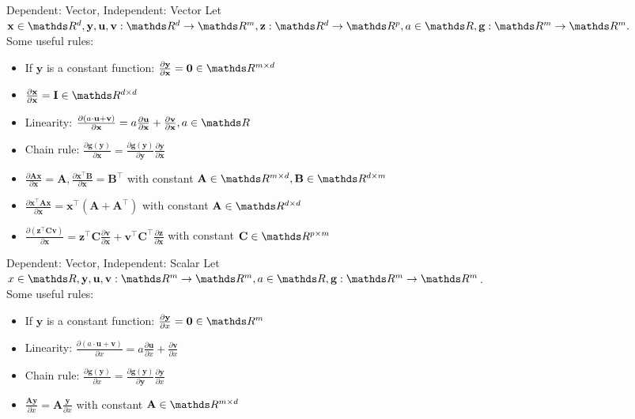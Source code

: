 \documentclass[11pt,compress,t,notes=noshow, xcolor=table]{beamer}
\begin{document}
\begin{vbframe}{Dependent: Vector, Independent: Vector}
Let $\mathbf{x} \in \R^d, \mathbf{y},  \mathbf{u}, \mathbf{v}: \R^d \rightarrow \R^m,\mathbf{z}:\R^d\rightarrow\R^p, a \in \R, \mathbf{g}:\R^m\rightarrow  \R^m.$ \\
\medskip
Some useful rules:
\begin{itemize}
    \item If $\mathbf{y}$ is a constant function: $\frac{\partial \mathbf{y}}{\partial \mathbf{x}} = \mathbf{0} \in \R^{m \times d}$
    \item $\frac{\partial \mathbf{x}}{\partial \mathbf{x}} = \mathbf{I} \in \R^{d \times d}$
    \item Linearity: $\frac{\partial (a\cdot \mathbf{u} + \mathbf{v})}{\partial \mathbf{x}} = a\frac{\partial \mathbf{u}}{\partial \mathbf{x}} + \frac{\partial \mathbf{v}}{\partial \mathbf{x}}, a \in \R $
    \item Chain rule: $\frac{\partial \mathbf{g}(\mathbf{y})}{\partial \mathbf{x}} = \frac{\partial \mathbf{g}(\mathbf{y})}{\partial \mathbf{y}}\frac{\partial \mathbf{y}}{\partial \mathbf{x}}$
    \item $\frac{\partial \mathbf{A}\mathbf{x}}{\partial\mathbf{x}} =  \mathbf{A}, \frac{\partial \mathbf{x}^\top\mathbf{B}}{\partial\mathbf{x}} = \mathbf{B}^\top$ with constant $\mathbf{A} \in \R^{m\times d}, \mathbf{B} \in \R^{d \times m}$
    \item $\frac{\partial \mathbf{x}^\top\mathbf{A}\mathbf{x}}{\partial\mathbf{x}} =  \mathbf{x}^\top(\mathbf{A} + \mathbf{A}^\top)$ with constant $\mathbf{A} \in \R^{d\times d}$
    \item $ \frac{\partial(\mathbf{z}^\top \mathbf{C} \mathbf{v})}{\partial\mathbf{x}} = \mathbf{z}^\top \mathbf{C}\frac{\partial\mathbf{v}}{\partial\mathbf{x}} + \mathbf{v}^\top\mathbf{C}^\top\frac{\partial \mathbf{z}}{\partial \mathbf{x}}$ with constant $\mathbf{C} \in \R^{p\times m}$
\end{itemize}
\end{vbframe}

\begin{vbframe}{Dependent: Vector, Independent: Scalar}
Let  $x \in \R, \mathbf{y},  \mathbf{u}, \mathbf{v}: \R^m \rightarrow \R^m, a \in \R, \mathbf{g}:\R^m\rightarrow  \R^m$. \\
\medskip
Some useful rules:
\begin{itemize}
    \item If $\mathbf{y}$ is a constant function: $\frac{\partial \mathbf{y}}{\partial x} = \mathbf{0} \in \R^{m}$
    \item Linearity: $\frac{\partial (a\cdot \mathbf{u} + \mathbf{v})}{\partial x} = a\frac{\partial \mathbf{u}}{\partial x} + \frac{\partial \mathbf{v}}{\partial x} $
    \item Chain rule: $\frac{\partial \mathbf{g}(\mathbf{y})}{\partial x} = \frac{\partial \mathbf{g}(\mathbf{y})}{\partial \mathbf{y}}\frac{\partial \mathbf{y}}{\partial x}$
    \item $\frac{\mathbf{A}\mathbf{y}}{\partial x} = \mathbf{A}\frac{\mathbf{y}}{\partial x}$ with constant $\mathbf{A} \in \R^{m\times d}$
\end{itemize}
\end{vbframe}
\end{document}
